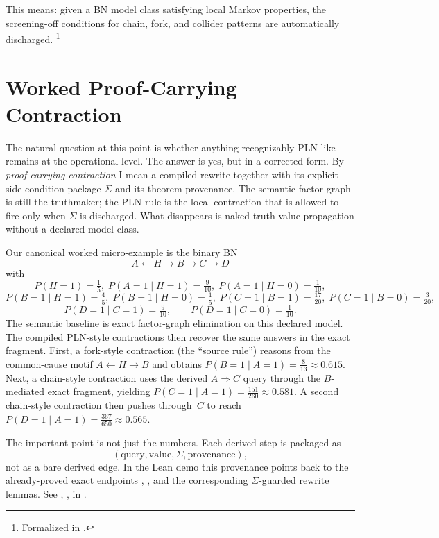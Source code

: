 \documentclass[11pt,openany]{report}
\begin{document}
This means: given a BN model class satisfying local Markov properties,
the screening-off conditions for chain, fork, and collider patterns are
automatically discharged.%
\footnote{Formalized in .}

\section{Worked Proof-Carrying Contraction}

The natural question at this point is whether anything recognizably
PLN-like remains at the operational level.  The answer is yes, but in a
corrected form.  By \emph{proof-carrying contraction} I mean a compiled
rewrite together with its explicit side-condition package $\Sigma$ and
its theorem provenance.  The semantic factor graph is still the
truthmaker; the PLN rule is the local contraction that is allowed to fire
only when $\Sigma$ is discharged.  What disappears is naked truth-value
propagation without a declared model class.

Our canonical worked micro-example is the binary BN
\[
  A \leftarrow H \to B \to C \to D
\]
with
\[
  P(H{=}1)=\tfrac15,\;
  P(A{=}1 \mid H{=}1)=\tfrac9{10},\;
  P(A{=}1 \mid H{=}0)=\tfrac1{10},
\]
\[
  P(B{=}1 \mid H{=}1)=\tfrac45,\;
  P(B{=}1 \mid H{=}0)=\tfrac15,\;
  P(C{=}1 \mid B{=}1)=\tfrac{17}{20},\;
  P(C{=}1 \mid B{=}0)=\tfrac3{20},
\]
\[
  P(D{=}1 \mid C{=}1)=\tfrac9{10},\qquad
  P(D{=}1 \mid C{=}0)=\tfrac1{10}.
\]
The semantic baseline is exact factor-graph elimination on this declared
model.  The compiled PLN-style contractions then recover the same answers
in the exact fragment.  First, a fork-style contraction (the ``source
rule'') reasons from the common-cause motif $A \leftarrow H \to B$ and
obtains $P(B{=}1 \mid A{=}1)=\tfrac8{13}\approx 0.615$.  Next, a
chain-style contraction uses the derived $A \Rightarrow C$ query through
the $B$-mediated exact fragment, yielding
$P(C{=}1 \mid A{=}1)=\tfrac{151}{260}\approx 0.581$.  A second
chain-style contraction then pushes through~$C$ to reach
$P(D{=}1 \mid A{=}1)=\tfrac{367}{650}\approx 0.565$.

The important point is not just the numbers.  Each derived step is
packaged as
\[
  (\text{query}, \text{value}, \Sigma, \text{provenance}),
\]
not as a bare derived edge.  In the Lean demo this provenance points back
to the already-proved exact endpoints
,
, and the corresponding
$\Sigma$-guarded rewrite lemmas.  See
,
,
 in
.
\end{document}
